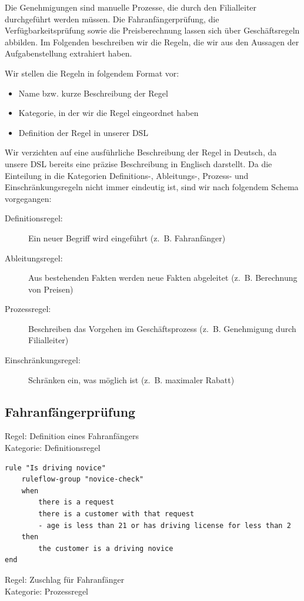 Die Genehmigungen sind manuelle Prozesse, die durch den Filialleiter durchgeführt werden müssen.
Die Fahranfängerprüfung, die Verfügbarkeitsprüfung sowie die Preisberechnung lassen sich über
Geschäftsregeln abbilden. 
Im Folgenden beschreiben wir die Regeln, die wir aus den Aussagen der Aufgabenstellung
extrahiert haben.

Wir stellen die Regeln in folgendem Format vor:
\begin{itemize}
	\item Name bzw. kurze Beschreibung der Regel
	\item Kategorie, in der wir die Regel eingeordnet haben
	\item Definition der Regel in unserer DSL
\end{itemize}
Wir verzichten auf eine ausführliche Beschreibung der Regel in Deutsch, da unsere
DSL bereits eine präzise Beschreibung in Englisch darstellt. Da die Einteilung in die
Kategorien Definitions-, Ableitungs-, Prozess- und Einschränkungsregeln nicht immer
eindeutig ist, sind wir nach folgendem Schema vorgegangen:
\begin{description}
	\item[Definitionsregel:] Ein neuer Begriff wird eingeführt (z.~B. Fahranfänger)
	\item[Ableitungsregel:] Aus bestehenden Fakten werden neue Fakten abgeleitet (z.~B. Berechnung von Preisen)
	\item[Prozessregel:] Beschreiben das Vorgehen im Geschäftsprozess (z.~B. Genehmigung durch Filialleiter)
	\item[Einschränkungsregel:] Schränken ein, was möglich ist (z.~B. maximaler Rabatt)
\end{description}

\subsection{Fahranfängerprüfung}

Regel: Definition eines Fahranfängers \\
Kategorie: Definitionsregel

\begin{lstlisting}
rule "Is driving novice" 
	ruleflow-group "novice-check"
	when
		there is a request
		there is a customer with that request
		- age is less than 21 or has driving license for less than 2	
	then
		the customer is a driving novice	
end
\end{lstlisting}

Regel: Zuschlag für Fahranfänger \\
Kategorie: Prozessregel

